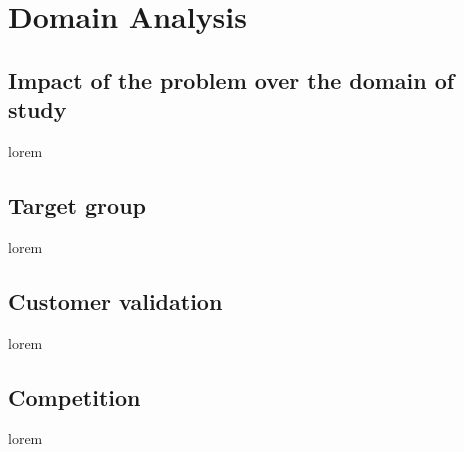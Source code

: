 \section{Domain Analysis}

\subsection{Impact of the problem over the domain of study}
\par lorem

\subsection{Target group}
\par lorem

\subsection{Customer validation}
\par lorem

\subsection{Competition}
\par lorem

\clearpage